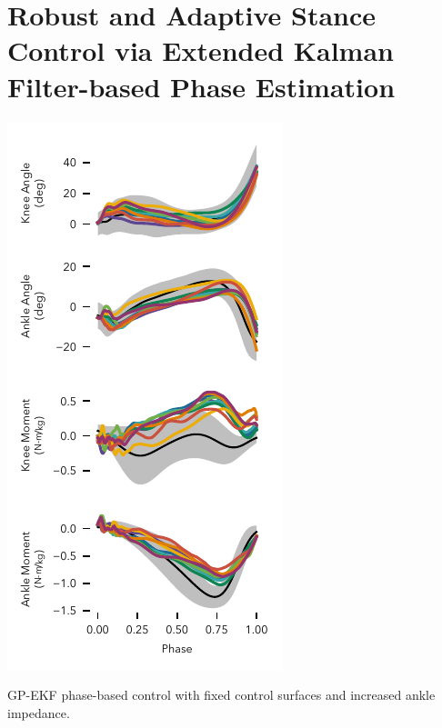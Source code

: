 \chapter{Robust and Adaptive Stance Control via Extended Kalman Filter-based
Phase Estimation}\label{sec:phase_estimation}

\graphicspath{{chapters/phase_estimation/figures/}}






\begin{marginfigure}
    \centering
    \includegraphics[width=\linewidth]{normal_data_fixed_ankle}
    \caption{GP-EKF phase-based control with fixed control surfaces and
    increased ankle impedance.}\label{fig:gp_ekf_fixed}
\end{marginfigure}
